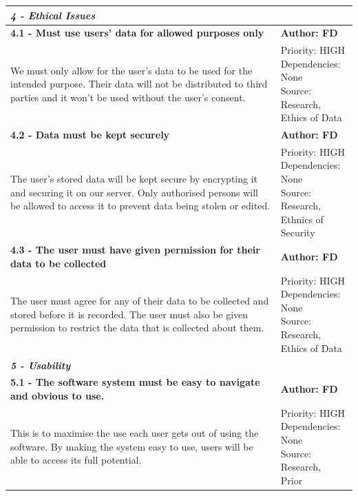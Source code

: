 \documentclass[10pt]{report}
\begin{document}
\begin{center}
\begin{longtable}{| p{13cm} | p{3cm} |}
\multicolumn{2}{|l|}{\textbf{\textit{4 - Ethical Issues}}} \\
\hline
\textbf{4.1 - Must use users’ data for allowed purposes only} & \textbf{Author: FD} \\
\hline
We must only allow for the user’s data to be used for the intended purpose. Their data will not be distributed to third parties and it won’t be used without the user’s consent.&
\makecell{Priority: HIGH\\Dependencies: None\\Source: Research,\\Ethics of Data}\\
\hline
\textbf{4.2 - Data must be kept securely} & \textbf{Author: FD} \\
\hline
The user’s stored data will be kept secure by encrypting it and securing it on our server. Only authorised persons will be allowed to access it to prevent data being stolen or edited.&
\makecell{Priority: HIGH\\Dependencies: None\\Source: Research,\\Ethnics of Security}\\
\hline
\textbf{4.3 - The user must have given permission for their data to be collected} & \textbf{Author: FD} \\
\hline
The user must agree for any of their data to be collected and stored before it is recorded. The user must also be given permission to restrict the data that is collected about them.&
\makecell{Priority: HIGH\\Dependencies: None\\Source: Research,\\Ethics of Data}\\
\hline

\multicolumn{2}{|l|}{\textbf{\textit{5 - Usability}}} \\
\hline
\textbf{5.1 - The software system must be easy to navigate and obvious to use.} & \textbf{Author: FD} \\
\hline
This is to maximise the use each user gets out of using the software. By making  the system easy to use, users will be able to access its full potential.&
\makecell{Priority: HIGH\\Dependencies: None\\Source: Research,\\Prior}\\
\hline


\end{longtable}
\end{center}
\end{document}

